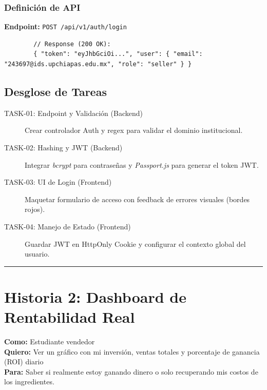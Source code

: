 \documentclass[11pt, letterpaper]{article}
\begin{document}
    \subsubsection*{Definición de API}
    \textbf{Endpoint:} \texttt{POST /api/v1/auth/login}
    \begin{verbatim}
        // Response (200 OK):
        { "token": "eyJhbGciOi...", "user": { "email": "243697@ids.upchiapas.edu.mx", "role": "seller" } }
    \end{verbatim}
   
    \subsection{Desglose de Tareas}
    \begin{description}
        \item[TASK-01: Endpoint y Validación (Backend)] Crear controlador Auth y regex para validar el dominio institucional.
        \item[TASK-02: Hashing y JWT (Backend)] Integrar \textit{bcrypt} para contraseñas y \textit{Passport.js} para generar el token JWT.
        \item[TASK-03: UI de Login (Frontend)] Maquetar formulario de acceso con feedback de errores visuales (bordes rojos).
        \item[TASK-04: Manejo de Estado (Frontend)] Guardar JWT en HttpOnly Cookie y configurar el contexto global del usuario.
    \end{description}

    \vspace{1em}
    \hrule
    \vspace{2em}

    \section{Historia 2: Dashboard de Rentabilidad Real}
   
    \begin{tcolorbox}[colback=blue!5!white,colframe=blue!75!black,title=HU-02: Cálculo de Rentabilidad]
        \textbf{Como:} Estudiante vendedor \\
        \textbf{Quiero:} Ver un gráfico con mi inversión, ventas totales y porcentaje de ganancia (ROI) diario \\
        \textbf{Para:} Saber si realmente estoy ganando dinero o solo recuperando mis costos de los ingredientes.
    \end{tcolorbox}
   
\end{document}
